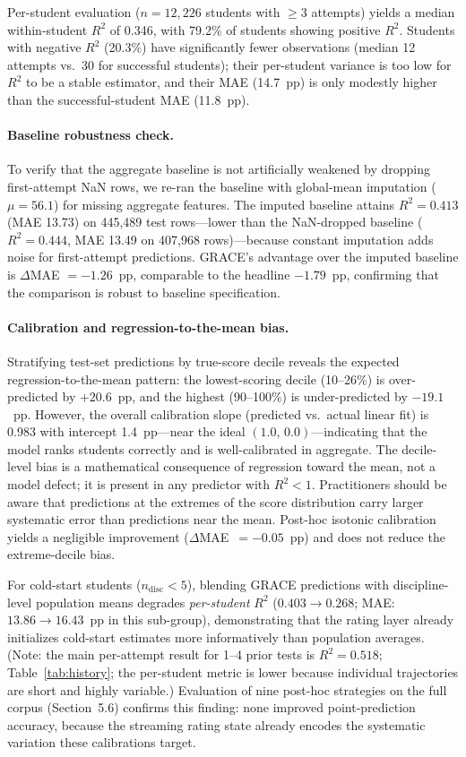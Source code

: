 \documentclass[11pt]{article}
\begin{document}
Per-student evaluation ($n = 12{,}226$ students with $\ge$3 attempts) yields a median
within-student $R^{2}$ of 0.346, with 79.2\% of students showing positive $R^{2}$.
Students with negative $R^{2}$ (20.3\%) have significantly fewer observations
(median 12 attempts vs.\ 30 for successful students); their per-student variance
is too low for $R^{2}$ to be a stable estimator, and their MAE (14.7~pp) is only
modestly higher than the successful-student MAE (11.8~pp).

\paragraph{Baseline robustness check.}
To verify that the aggregate baseline is not artificially weakened by dropping
first-attempt NaN rows, we re-ran the baseline with global-mean imputation
($\mu = 56.1$) for missing aggregate features.
The imputed baseline attains $R^{2} = 0.413$ (MAE 13.73) on 445{,}489 test rows---lower
than the NaN-dropped baseline ($R^{2} = 0.444$, MAE 13.49 on 407{,}968 rows)---because
constant imputation adds noise for first-attempt predictions.
GRACE's advantage over the imputed baseline is $\Delta$MAE $= -1.26$~pp,
comparable to the headline $-1.79$~pp, confirming that the comparison
is robust to baseline specification.

\paragraph{Calibration and regression-to-the-mean bias.}
Stratifying test-set predictions by true-score decile reveals the expected
regression-to-the-mean pattern: the lowest-scoring decile (10--26\%) is over-predicted
by $+20.6$~pp, and the highest (90--100\%) is under-predicted by $-19.1$~pp.
However, the overall calibration slope (predicted vs.\ actual linear fit) is
0.983 with intercept 1.4~pp---near the ideal $(1.0,\, 0.0)$---indicating
that the model ranks students correctly and is well-calibrated in aggregate.
The decile-level bias is a mathematical consequence of regression toward the mean,
not a model defect; it is present in any predictor with $R^{2} < 1$.
Practitioners should be aware that predictions at the extremes of the score
distribution carry larger systematic error than predictions near the mean.
Post-hoc isotonic calibration yields a negligible
improvement ($\Delta$MAE~$= -0.05$~pp) and does not reduce the extreme-decile bias.

For cold-start students ($n_{\text{disc}} < 5$), blending GRACE predictions with
discipline-level population means degrades \emph{per-student} $R^{2}$ ($0.403 \to 0.268$;
MAE: $13.86 \to 16.43$~pp in this sub-group), demonstrating that the rating layer already
initializes cold-start estimates more informatively than population averages.
(Note: the main per-attempt result for 1--4 prior tests is $R^{2}=0.518$;
Table~\ref{tab:history}; the per-student metric is lower because individual trajectories
are short and highly variable.)
Evaluation of nine post-hoc strategies on the full corpus
(Section~5.6) confirms this finding: none improved point-prediction accuracy,
because the streaming rating state already encodes the systematic variation these
calibrations target.
\end{document}
